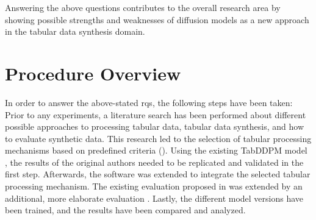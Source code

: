 Answering the above questions contributes to the overall research area by showing possible strengths and weaknesses of diffusion \glspl{model}
as a new approach in the tabular data synthesis domain.

\section{Procedure Overview}
\label{ch:intro-proceeding}
In order to answer the above-stated \glspl{rq}, the following steps have been taken:
Prior to any experiments, a literature search has been performed about different possible approaches to processing tabular data, tabular data synthesis, and how to evaluate synthetic data.
This research led to the selection of tabular processing mechanisms based on predefined criteria ().
Using the existing TabDDPM \gls{model} \cite{kotelnikov2022TabDDPMModellingTabular}, the results of the original authors needed to be replicated and validated in the first step.
Afterwards, the software was extended to integrate the selected tabular processing mechanism.
The existing evaluation proposed in \cite{kotelnikov2022TabDDPMModellingTabular} was extended by an additional, more elaborate evaluation \cite{chundawat2022UniversalMetricRobust}.
Lastly, the different \gls{model} versions have been trained, and the results have been compared and analyzed.

